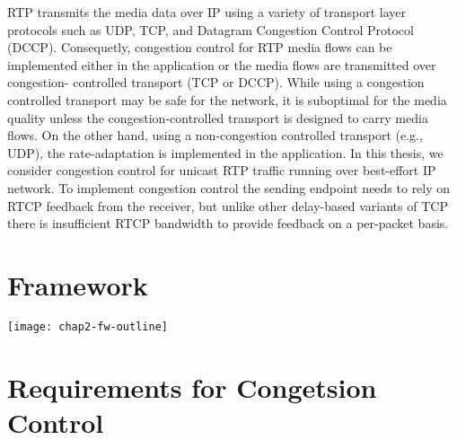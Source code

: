
RTP transmits the media data over IP using a variety of transport layer
protocols such as UDP, TCP, and Datagram Congestion Control Protocol (DCCP).
Consequetly, congestion control for RTP media flows can be implemented either
in the application or the media flows are transmitted over congestion-
controlled transport (TCP or DCCP). While using a congestion controlled
transport may be safe for the network, it is suboptimal for the media quality
unless the congestion-controlled transport is designed to carry media flows.
On the other hand, using a non-congestion controlled transport (e.g., UDP),
the rate-adaptation is implemented in the application. In this thesis, we
consider congestion control for unicast RTP traffic running over best-effort
IP network. To implement congestion control the sending endpoint needs to rely
on RTCP feedback from the receiver, but unlike other delay-based variants of
TCP there is insufficient RTCP bandwidth to provide feedback on a per-packet
basis.


\section{Framework}
\label{fw.fw}


\texttt{[image: chap2-fw-outline]}

\section{Requirements for Congetsion Control}
\label{fw.cc.eval}